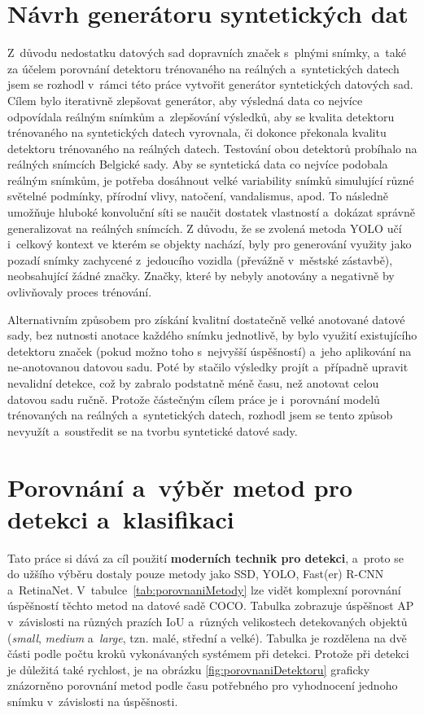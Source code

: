 \section{Návrh generátoru syntetických dat}
Z~důvodu nedostatku datových sad dopravních značek s~plnými snímky, a~také za účelem porovnání detektoru trénovaného na reálných a~syntetických datech jsem se rozhodl v~rámci této práce vytvořit generátor syntetických datových sad. Cílem bylo iterativně zlepšovat generátor, aby výsledná data co nejvíce odpovídala reálným snímkům a~zlepšování výsledků, aby se kvalita detektoru trénovaného na syntetických datech vyrovnala, či dokonce překonala kvalitu detektoru trénovaného na reálných datech. Testování obou detektorů probíhalo na reálných snímcích Belgické sady. Aby se syntetická data co nejvíce podobala reálným snímkům, je potřeba dosáhnout velké variability snímků simulující různé světelné podmínky, přírodní vlivy, natočení, vandalismus, apod. To následně umožňuje hluboké konvoluční síti se naučit dostatek vlastností a~dokázat správně generalizovat na reálných snímcích. Z důvodu, že se zvolená metoda YOLO učí i~celkový kontext ve kterém se objekty nachází, byly pro generování využity jako pozadí snímky zachycené z~jedoucího vozidla (převážně v~městské zástavbě), neobsahující žádné značky. Značky, které by nebyly anotovány a negativně by ovlivňovaly proces trénování.

Alternativním způsobem pro získání kvalitní dostatečně velké anotované datové sady, bez nutnosti anotace každého snímku jednotlivě, by bylo využití existujícího detektoru značek (pokud možno toho s~nejvyšší úspěšností) a~jeho aplikování na ne-anotovanou datovou sadu. Poté by stačilo výsledky projít a~případně upravit nevalidní detekce, což by zabralo podstatně méně času, než anotovat celou datovou sadu ručně. Protože částečným cílem práce je i~porovnání modelů trénovaných na reálných a~syntetických datech, rozhodl jsem se tento způsob nevyužít a~soustředit se na tvorbu syntetické datové sady.




\section{Porovnání a~výběr metod pro detekci a~klasifikaci}
\label{navrhDetekce}
Tato práce si dává za cíl použití \textbf{moderních technik pro detekci}, a~proto se do užšího výběru dostaly pouze metody jako SSD, YOLO, Fast(er) R-CNN a~RetinaNet. V~tabulce~\ref{tab:porovnaniMetody} lze vidět komplexní porovnání úspěšností těchto metod na datové sadě COCO. Tabulka zobrazuje úspěšnost AP v~závislosti na různých prazích IoU a~různých velikostech detekovaných objektů (\emph{small}, \emph{medium} a~\emph{large}, tzn. malé, střední a velké). Tabulka je rozdělena na dvě části podle počtu kroků vykonávaných systémem při detekci. Protože při detekci je důležitá také rychlost, je na obrázku \ref{fig:porovnaniDetektoru} graficky znázorněno porovnání metod podle času potřebného pro vyhodnocení jednoho snímku v~závislosti na úspěšnosti.

